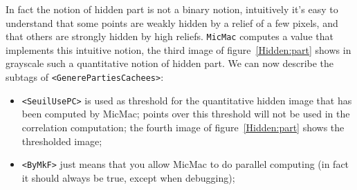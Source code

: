 In fact the notion of hidden part is not a binary notion, intuitively it's
easy to understand that some points are weakly hidden by a relief of a few pixels,
and that others are strongly hidden by high reliefs. {\tt MicMac} computes a value
that implements this intuitive notion, the third image of figure~\ref{Hidden:part}
shows in grayscale such a quantitative notion of hidden part.
We can now describe the subtags of {\tt <GenerePartiesCachees>}:


\begin{itemize}
   \item  {\tt  <SeuilUsePC>} is used as threshold for the quantitative hidden
          image that has been computed by MicMac; points over this threshold
          will not be used in the correlation computation; the fourth image of
          figure~\ref{Hidden:part} shows the thresholded image;
   \item  {\tt  <ByMkF>} just means that you allow MicMac to do parallel
          computing (in fact it should always be true, except when debugging);
\end{itemize}


